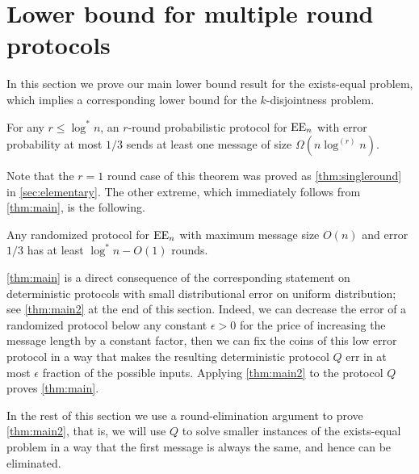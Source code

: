 \section{Lower bound for multiple round protocols}
\label{sec:lowerbound}



In this section we prove our main lower bound result for the 
exists-equal problem, which implies a corresponding lower bound
for the $k$-disjointness problem.
\begin{theorem}
\label{thm:main}
For any $r\leq\log^*n$, an $r$-round probabilistic protocol for
$\operatorname{EE}_n$ with error probability at most $1/3$ sends at least one
message of size $\Omega(n\log^{(r)}n)$.
\end{theorem}

Note that the $r=1$ round case of this theorem was proved as
\autoref{thm:singleround} in \autoref{sec:elementary}. The other
extreme, which immediately follows from \autoref{thm:main}, is
the following.

\begin{corollary}
Any randomized protocol for $\operatorname{EE}_n$ with maximum message size
$O(n)$ and error $1/3$ has at least $\log^* n - O(1)$ rounds.
\end{corollary}

\autoref{thm:main} is a direct consequence of the corresponding
statement on deterministic protocols with small distributional
error on uniform distribution; see \autoref{thm:main2} at the
end of this section. Indeed, we can decrease the error of a
randomized protocol below any constant $\epsilon>0$ for the
price of increasing the message length by a constant factor,
then we can fix the coins of this low error protocol in a way
that makes the resulting deterministic protocol $Q$ err in at
most $\epsilon$ fraction of the possible inputs. Applying
\autoref{thm:main2} to the protocol $Q$ proves
\autoref{thm:main}.

In the rest of this section we use a round-elimination argument
to prove \autoref{thm:main2}, that is, we will use $Q$ to solve
smaller instances of the exists-equal problem in a way that the
first message is always the same, and hence can be eliminated.

